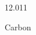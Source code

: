 \documentclass[12pt]{article}
\begin{document}
\hfill{}
\vfill
\begin{center}
  {\fontsize{50}{60}
  }

  \vspace{1em}

  12.011

Carbon
\end{center}
\vfill
\end{document}
